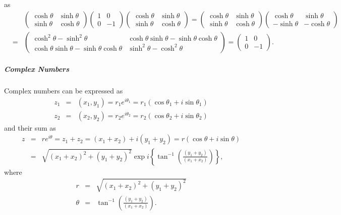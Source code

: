 \documentclass[aps,preprint]{revtex4}
\begin{document}
as 
\begin{eqnarray}
&&\left( 
\begin{array}{cc}
\cosh \theta & \sinh \theta \\ 
\sinh \theta & \cosh \theta%
\end{array}%
\right) \left( 
\begin{array}{cc}
1 & 0 \\ 
0 & -1%
\end{array}%
\right) \left( 
\begin{array}{cc}
\cosh \theta & \sinh \theta \\ 
\sinh \theta & \cosh \theta%
\end{array}%
\right) =\left( 
\begin{array}{cc}
\cosh \theta & \sinh \theta \\ 
\sinh \theta & \cosh \theta%
\end{array}%
\right) \left( 
\begin{array}{cc}
\cosh \theta & \sinh \theta \\ 
-\sinh \theta & -\cosh \theta%
\end{array}%
\right) \\
&=&\left( 
\begin{array}{cc}
\cosh ^{2}\theta -\sinh ^{2}\theta & \cosh \theta \sinh \theta -\sinh \theta
\cosh \theta \\ 
\cosh \theta \sinh \theta -\sinh \theta \cosh \theta & \sinh ^{2}\theta
-\cosh ^{2}\theta%
\end{array}%
\right) =\left( 
\begin{array}{cc}
1 & 0 \\ 
0 & -1%
\end{array}%
\right) .
\end{eqnarray}

\subparagraph{Complex Numbers}

Complex numbers can be expressed as 
\begin{eqnarray}
z_{1} &=&\left( x_{1},y_{1}\right) =r_{1}e^{i\theta _{1}}=r_{1}\left( \cos
\theta _{1}+i\sin \theta _{1}\right) \\
z_{2} &=&\left( x_{2},y_{2}\right) =r_{2}e^{i\theta _{2}}=r_{2}\left( \cos
\theta _{2}+i\sin \theta _{2}\right)
\end{eqnarray}%
and their sum as 
\begin{eqnarray}
z &=&re^{i\theta }=z_{1}+z_{2}=\left( x_{1}+x_{2}\right) +i\left(
y_{1}+y_{2}\right) =r\left( \cos \theta +i\sin \theta \right) \\
&=&\sqrt{\left( x_{1}+x_{2}\right) ^{2}+\left( y_{1}+y_{2}\right) ^{2}}\exp
i\left\{ \tan ^{-1}\left( \frac{\left( y_{1}+y_{2}\right) }{\left(
x_{1}+x_{2}\right) }\right) \right\} ,
\end{eqnarray}%
where%
\begin{eqnarray}
r &=&\sqrt{\left( x_{1}+x_{2}\right) ^{2}+\left( y_{1}+y_{2}\right) ^{2}} \\
\theta &=&\tan ^{-1}\left( \frac{\left( y_{1}+y_{2}\right) }{\left(
x_{1}+x_{2}\right) }\right) .
\end{eqnarray}
\end{document}
